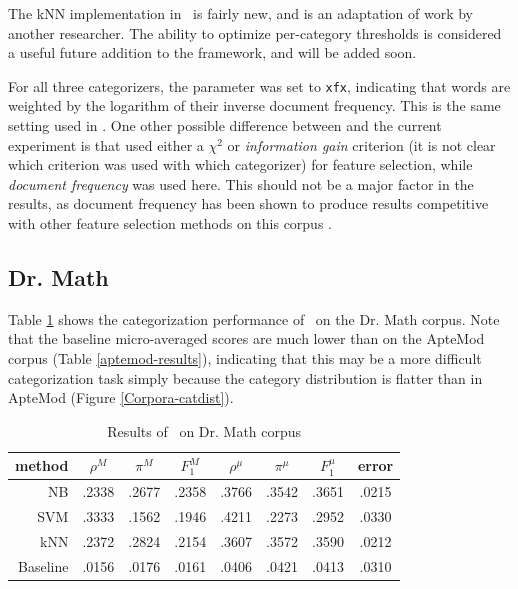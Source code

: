 The kNN implementation in \aicat\ is fairly new, and is an adaptation
of work by another researcher.  The ability to optimize per-category
thresholds is considered a useful future addition to the framework,
and will be added soon.

For all three categorizers, the  parameter was set to
\texttt{xfx}, indicating that words are weighted by the logarithm of
their inverse document frequency.  This is the same setting used in
\cite{yang:99}.  One other possible difference between \cite{yang:99}
and the current experiment is that \cite{yang:99} used either a
$\chi^2$ or \emph{information gain} criterion (it is not clear which
criterion was used with which categorizer) for feature selection,
while \emph{document frequency} was used here.  This should not be a
major factor in the results, as document frequency has been shown to
produce results competitive with other feature selection methods on
this corpus \cite{yang:97}.



\subsection{Dr. Math}

Table \ref{drmath-results} shows the categorization performance of
\aicat\ on the Dr. Math corpus.  Note that the baseline micro-averaged
scores are much lower than on the ApteMod corpus (Table
\ref{aptemod-results}), indicating that this may be a more difficult
categorization task simply because the category distribution is
flatter than in ApteMod (Figure \ref{Corpora-catdist}).


\begin{table}
\begin{center}
\begin{tabular}{|r c c c c c c c|}
\hline
method    & $\rho^M$ & $\pi^M$ & $F_1^M$ & $\rho^\mu$ & $\pi^\mu$ & $F_1^\mu$ &   error \\
\hline
NB        &   .2338  &  .2677  &  .2358  &  .3766     &  .3542    &  .3651    &  .0215  \\
SVM       &   .3333  &  .1562  &  .1946  &  .4211     &  .2273    &  .2952    &  .0330  \\
kNN       &   .2372  &  .2824  &  .2154  &  .3607     &  .3572    &  .3590    &  .0212  \\
Baseline  &   .0156  &  .0176  &  .0161  &  .0406     &  .0421    &  .0413    &  .0310  \\
\hline
\end{tabular}
\end{center}
\caption{Results of \aicat\ on Dr. Math corpus}
\label{drmath-results}
\end{table}

